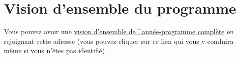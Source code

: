 % 
% 
% 
% 
% 
% 
% 
% 

\section{Vision d'ensemble du programme}\hypertarget{vision-densemble-du-programme}{}\label{vision-densemble-du-programme}

Vous pouvez avoir une \href{\route{abs\_pday/cal?in=unan/program}}{vision d'ensemble de l'année-programme complète} en rejoignant cette adresse (vous pouvez cliquer sur ce lien qui vous y conduira même si vous n'êtes pas identifié).

